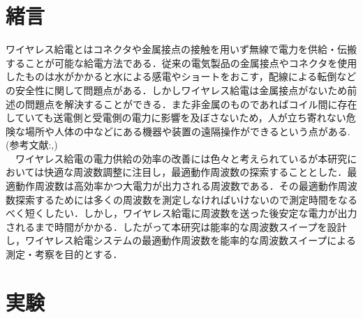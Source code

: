 \documentclass[10pt,a4paper,twocolumn]{jarticle}
\begin{document}


\section{緒言}
ワイヤレス給電とはコネクタや金属接点の接触を用いず無線で電力を供給・伝搬することが可能な給電方法である．従来の電気製品の金属接点やコネクタを使用したものは水がかかると水による感電やショートをおこす，配線による転倒などの安全性に関して問題点がある．しかしワイヤレス給電は金属接点がないため前述の問題点を解決することができる．また非金属のものであればコイル間に存在していても送電側と受電側の電力に影響を及ぼさないため，人が立ち寄れない危険な場所や人体の中などにある機器や装置の遠隔操作ができるという点がある.(参考文献:\cite{syourai},\cite{rohm1})
\\　ワイヤレス給電の電力供給の効率の改善には色々と考えられているが本研究においては快適な周波数調整に注目し，最適動作周波数の探索することとした．最適動作周波数は高効率かつ大電力が出力される周波数である．その最適動作周波数探索するためには多くの周波数を測定しなければいけないので測定時間をなるべく短くしたい．しかし，ワイヤレス給電に周波数を送った後安定な電力が出力されるまで時間がかかる．したがって本研究は能率的な周波数スイープを設計し，ワイヤレス給電システムの最適動作周波数を能率的な周波数スイープによる測定・考察を目的とする．
\section{実験}
\end{document}
